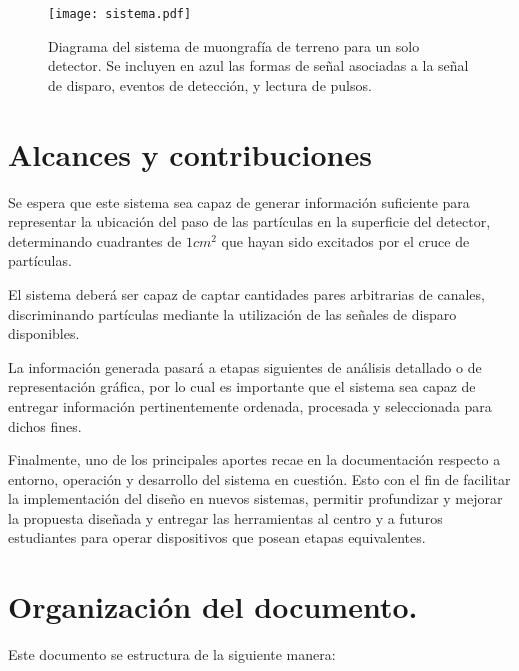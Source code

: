 {	\begin{figure}[h]
		\centering
		\texttt{[image: sistema.pdf]}
		\caption{Diagrama del sistema de muongrafía de terreno para un solo detector. Se incluyen en azul las formas de señal asociadas a la señal de disparo, eventos de detección, y lectura de pulsos.}
		\label{img:sistema}
	\end{figure}						

\section{Alcances y contribuciones}

	Se espera que este sistema sea capaz de generar información suficiente para representar la ubicación del paso de las partículas en la superficie del detector, determinando cuadrantes de $1cm^2$ que hayan sido excitados por el cruce de partículas.
	
	El sistema deberá ser capaz de captar cantidades pares arbitrarias de canales, discriminando partículas mediante la utilización de las señales de disparo disponibles.
	
	La información generada pasará a etapas siguientes de análisis detallado o de representación gráfica, por lo cual es importante que el sistema sea capaz de entregar información pertinentemente ordenada, procesada y seleccionada para dichos fines.
	
	Finalmente, uno de los principales aportes recae en la documentación respecto a entorno, operación y desarrollo del sistema en cuestión. Esto con el fin de facilitar la implementación del diseño en nuevos sistemas, permitir profundizar y mejorar la propuesta diseñada y entregar las herramientas al centro y a futuros estudiantes para operar dispositivos que posean etapas equivalentes.


\section{Organización del documento.}

	Este documento se estructura de la siguiente manera: 
	
}
